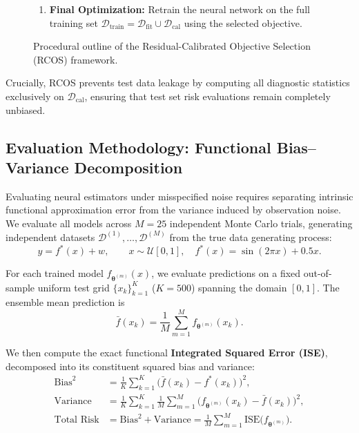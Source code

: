 \begin{figure}[H]
{{\begin{enumerate}
\begin{itemize}
        \item \textbf{Standard Gaussian Regime (Otherwise):} Select Gaussian MSE.
      \end{itemize}
      \item \textbf{Final Optimization:} Retrain the neural network on the full training set $\mathcal{D}_{\text{train}} = \mathcal{D}_{\text{fit}} \cup \mathcal{D}_{\text{cal}}$ using the selected objective.
    \end{enumerate}
  }}
  \caption{Procedural outline of the Residual-Calibrated Objective Selection (RCOS) framework.}
  \label{fig:rcos_box}
\end{figure}

Crucially, RCOS prevents test data leakage by computing all diagnostic statistics exclusively on $\mathcal{D}_{\text{cal}}$, ensuring that test set risk evaluations remain completely unbiased.

\subsection{Evaluation Methodology: Functional Bias--Variance Decomposition}
\label{sec:nn_metrics}

Evaluating neural estimators under misspecified noise requires separating intrinsic functional approximation error from the variance induced by observation noise. We evaluate all models across $M = 25$ independent Monte Carlo trials, generating independent datasets $\mathcal{D}^{(1)}, \dots, \mathcal{D}^{(M)}$ from the true data generating process:
\begin{equation}
  y = f^*(x) + w, \qquad x \sim \mathcal{U}[0, 1], \quad f^*(x) = \sin(2\pi x) + 0.5x.
\end{equation}

For each trained model $f_{\boldsymbol{\theta}^{(m)}}(x)$, we evaluate predictions on a fixed out-of-sample uniform test grid $\{x_k\}_{k=1}^K$ ($K=500$) spanning the domain $[0, 1]$. The ensemble mean prediction is
\begin{equation}
  \bar{f}(x_k) = \frac{1}{M}\sum_{m=1}^M f_{\boldsymbol{\theta}^{(m)}}(x_k).
\end{equation}

We then compute the exact functional \textbf{Integrated Squared Error (ISE)}, decomposed into its constituent squared bias and variance:
\begin{align}
  \text{Bias}^2 &= \frac{1}{K}\sum_{k=1}^K \big(\bar{f}(x_k) - f^*(x_k)\big)^2, \label{eq:func_bias} \\
  \text{Variance} &= \frac{1}{K}\sum_{k=1}^K \frac{1}{M}\sum_{m=1}^M \big(f_{\boldsymbol{\theta}^{(m)}}(x_k) - \bar{f}(x_k)\big)^2, \label{eq:func_var} \\
  \text{Total Risk} &= \text{Bias}^2 + \text{Variance} = \frac{1}{M}\sum_{m=1}^M \text{ISE}\big(f_{\boldsymbol{\theta}^{(m)}}\big). \label{eq:func_risk}
\end{align}

